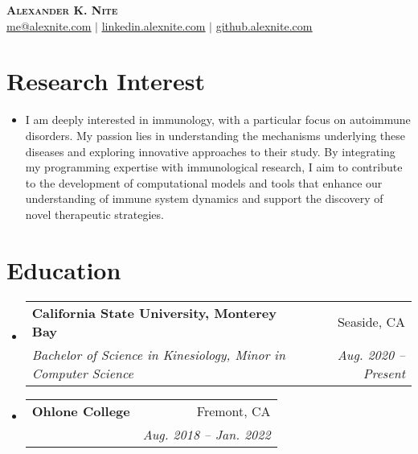 \documentclass[letterpaper,11pt]{article}
\makeatletter
\newcommand{\resumeSubheading}[4]{
  \vspace{-2pt}\item
    \begin{tabular*}{0.97\textwidth}[t]{l@{\extracolsep{\fill}}r}
      \textbf{#1} & #2 \\
      \textit{\small#3} & \textit{\small #4} \\
    \end{tabular*}\vspace{-7pt}
}
\newcommand{\resumeSubHeadingListStart}{\begin{itemize}[leftmargin=0.15in, label={}]}
\newcommand{\resumeSubHeadingListEnd}{\end{itemize}}
\makeatother
\begin{document}
\begin{center}
    \textbf{\Huge \scshape Alexander K. Nite} \\ \vspace{1pt}
    \small \href{mailto:me@alexnite.com}{\underline{me@alexnite.com}} $|$ 
    \href{https://linkedin.alexnite.com/}{\underline{linkedin.alexnite.com}} $|$
    \href{https://github.alexnite.com/}{\underline{github.alexnite.com}}
\end{center}

\section{Research Interest}
 \begin{itemize}[leftmargin=0.15in, label={}]
    \item{
     {I am deeply interested in immunology, with a particular focus on autoimmune disorders. My passion lies in understanding the mechanisms underlying these diseases and exploring innovative approaches to their study. By integrating my programming expertise with immunological research, I aim to contribute to the development of computational models and tools that enhance our understanding of immune system dynamics and support the discovery of novel therapeutic strategies.}
    }
 \end{itemize}

\section{Education}
  \resumeSubHeadingListStart
    \resumeSubheading
      {California State University, Monterey Bay}{Seaside, CA}
      {Bachelor of Science in Kinesiology, Minor in Computer Science}{Aug. 2020 -- Present}
    \resumeSubheading
      {Ohlone College}{Fremont, CA}
      {}{Aug. 2018 -- Jan. 2022}
  \resumeSubHeadingListEnd
  
\end{document}
